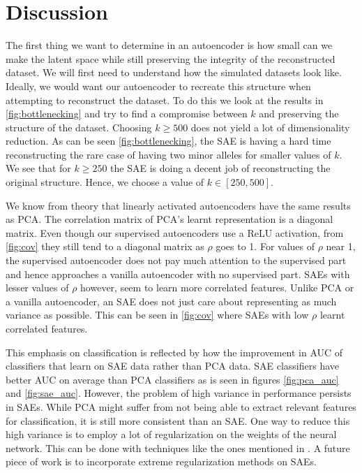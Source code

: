 \documentclass{article}
\begin{document}
\section{Discussion}
The first thing we want to determine in an autoencoder is how small can we make the latent space while still preserving the integrity of the reconstructed dataset. We will first need to understand how the simulated datasets look like. Ideally, we would want our autoencoder to recreate this structure when attempting to reconstruct the dataset. To do this we look at the results in \ref{fig:bottlenecking} and try to find a compromise between $k$ and preserving the structure of the dataset. Choosing $k \geq 500$ does not yield a lot of dimensionality reduction. As can be seen \ref{fig:bottlenecking}, the SAE is having a hard time reconstructing the rare case of having two minor alleles for smaller values of $k.$ We see that for $k\ge250$ the SAE is doing a decent job of reconstructing the original structure. Hence, we choose a value of $k \in [250, 500].$ 

We know from theory that linearly activated autoencoders have the same results as PCA. The correlation matrix of PCA's learnt representation is a diagonal matrix. Even though our supervised autoencoders use a ReLU activation, from \ref{fig:cov} they still tend to a diagonal matrix as $\rho$ goes to 1. For values of $\rho$ near 1, the supervised autoencoder does not pay much attention to the supervised part and hence approaches a vanilla autoencoder with no supervised part. SAEs with lesser values of $\rho$ however, seem to learn more correlated features. Unlike PCA or a vanilla autoencoder, an SAE does not just care about representing as much variance as possible. This can be seen in \ref{fig:cov} where SAEs with low $\rho$ learnt correlated features.

This emphasis on classification is reflected by how the improvement in AUC of classifiers that learn on SAE data rather than PCA data. SAE classifiers have better AUC on average than PCA classifiers as is seen in figures \ref{fig:pca_auc} and \ref{fig:sae_auc}. However, the problem of high variance in performance persists in SAEs. While PCA might suffer from not being able to extract relevant features for classification, it is still more consistent than an SAE. One way to reduce this high variance is to employ a lot of regularization on the weights of the neural network. This can be done with techniques like the ones mentioned in \cite{liu}. A future piece of work is to incorporate extreme regularization methods on SAEs. 
\end{document}
